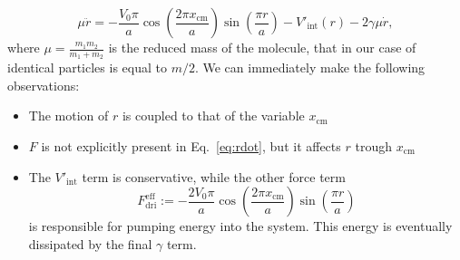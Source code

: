 
\begin{equation}
    \mu\ddot{r} =  -\frac{V_0\pi}{a}\cos \left(\frac{2\pi x_\text{cm}}{a}\right)\sin\left(\frac{\pi r}{a}\right)- V'_\text{int}(r) -2\gamma \mu \dot{r},
    \label{eq:rdot}
\end{equation}
where $\mu = \frac{m_1m_2}{m_1+m_2}$ is the reduced mass of the molecule, that in our case of identical particles is equal to $m/2$. 
We can immediately make the following observations:
\begin{itemize}

    \item The motion of $r$ is coupled to that of the variable $x_\text{cm}$
    
    \item $F$ is not explicitly present in Eq.~\eqref{eq:rdot}, but it affects $r$ trough $x_\text{cm}$
    
    \item The $V'_\text{int}$ term is conservative, while the other force term
    \begin{equation}
         F_{\text{dri}}^{\text{eff}} :=-\frac{2V_0\pi}{a}\cos \left(\frac{2\pi x_\text{cm}}{a}\right)\sin\left(\frac{\pi r}{a}\right)
         \label{eq:driving}
    \end{equation}
    is responsible for pumping energy into the system. This energy is eventually dissipated by the final $\gamma$ term.
    
\end{itemize}


